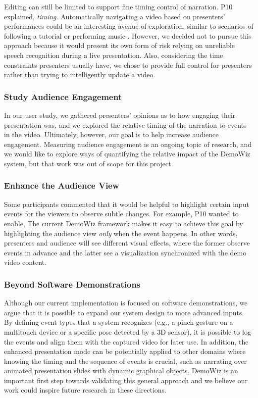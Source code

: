 Editing can still be limited to support fine timing control of narration. P10 explained,  \textit{timing.} Automatically navigating a video based on presenters’ performances could be an interesting avenue of exploration, similar to scenarios of following a tutorial \cite{Pongnumkul:2011ju} or performing music \cite{Lee:2005:IOC:1054972.1055073}. However, we decided not to pursue this approach because it would present its own form of risk relying on unreliable speech recognition during a live presentation. Also, considering the time constraints presenters usually have, we chose to provide full control for presenters rather than trying to intelligently update a video.

\subsubsection{Study Audience Engagement}
In our user study, we gathered presenters’ opinions as to how engaging their presentation was, and we explored the relative timing of the narration to events in the video. Ultimately, however, our goal is to help increase audience engagement. Measuring audience engagement is an ongoing topic of research, and we would like to explore ways of quantifying the relative impact of the DemoWiz system, but that work was out of scope for this project.

\subsubsection{Enhance the Audience View}
Some participants commented that it would be helpful to highlight certain input events for the viewers to observe subtle changes. For example, P10 wanted to enable,  The current DemoWiz framework makes it easy to achieve this goal by highlighting the audience view \textit{only} when the event happens. In other words, presenters and audience will see different visual effects, where the former observe events in advance and the latter see a visualization synchronized with the demo video content.

\subsubsection{Beyond Software Demonstrations}
Although our current implementation is focused on software demonstrations, we argue that it is possible to expand our system design to more advanced inputs. By defining event types that a system recognizes (e.g., a pinch gesture on a multitouch device or a specific pose detected by a 3D sensor), it is possible to log the events and align them with the captured video for later use. In addition, the enhanced presentation mode can be potentially applied to other domains where knowing the timing and the sequence of events is crucial, such as narrating over animated presentation slides with dynamic graphical objects. DemoWiz is an important first step towards validating this general approach and we believe our work could inspire future research in these directions.
